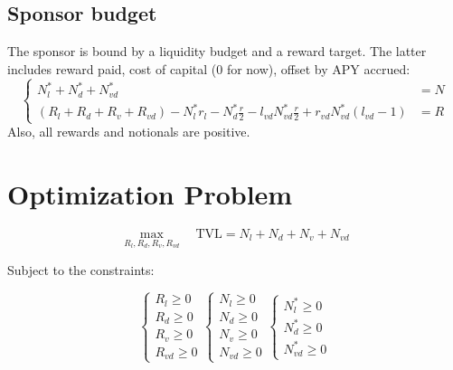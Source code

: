 \documentclass{article}
\begin{document}
\subsection{Sponsor budget}

The sponsor is bound by a liquidity budget and a reward target.
The latter includes reward paid, cost of capital (0 for now), offset by APY accrued:
\begin{equation}
    \left\{
    \begin{aligned}
    N_l^* + N_d^* + N_{vd}^* &= N\\
    (R_l+R_d+R_v+R_{vd}) - N_l^* r_l - N_d^* \frac{r}{2} 
    - l_{vd} N_{vd}^* \frac{r}{2} + r_{vd} N_{vd}^* (l_{vd}-1) &= R
    \end{aligned}
    \right.
\end{equation}
Also, all rewards and notionals are positive.

\section{Optimization Problem}

\begin{equation}
    \max_{R_l, R_d, R_v, R_{vd}} \quad \text{TVL} = N_l + N_d + N_v + N_{vd}
\end{equation}

Subject to the constraints:

\begin{equation}
    \left\{
    \begin{aligned}
    R_l \geq 0 \\
    R_d \geq 0 \\
    R_v \geq 0 \\
    R_{vd} \geq 0
    \end{aligned}
    \right.
    \left\{
    \begin{aligned}
    N_l \geq 0 \\
    N_d \geq 0 \\
    N_v \geq 0 \\
    N_{vd} \geq 0
    \end{aligned}
    \right.
    \left\{
    \begin{aligned}
    N_l^* \geq 0 \\
    N_d^* \geq 0 \\
    N_{vd}^* \geq 0
    \end{aligned}
    \right.
\end{equation}
\end{document}
